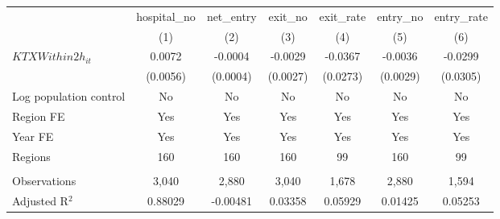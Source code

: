 \begingroup
\centering
\begin{tabular}{lcccccc}
   \toprule
                          & hospital\_no  & net\_entry  & exit\_no  & exit\_rate  & entry\_no  & entry\_rate \\    
                          & (1)           & (2)         & (3)       & (4)         & (5)        & (6)\\  
   \midrule 
   $KTXWithin2h_{it}$     & 0.0072        & -0.0004     & -0.0029   & -0.0367     & -0.0036    & -0.0299\\   
                          & (0.0056)      & (0.0004)    & (0.0027)  & (0.0273)    & (0.0029)   & (0.0305)\\   
   Log population control & No            & No          & No        & No          & No         & No\\  
   Region FE              & Yes           & Yes         & Yes       & Yes         & Yes        & Yes\\  
   Year FE                & Yes           & Yes         & Yes       & Yes         & Yes        & Yes\\  
   Regions                & 160           & 160         & 160       & 99          & 160        & 99\\  
    \\
   Observations           & 3,040         & 2,880       & 3,040     & 1,678       & 2,880      & 1,594\\  
   Adjusted R$^2$         & 0.88029       & -0.00481    & 0.03358   & 0.05929     & 0.01425    & 0.05253\\  
   \bottomrule
\end{tabular}
\par\endgroup
